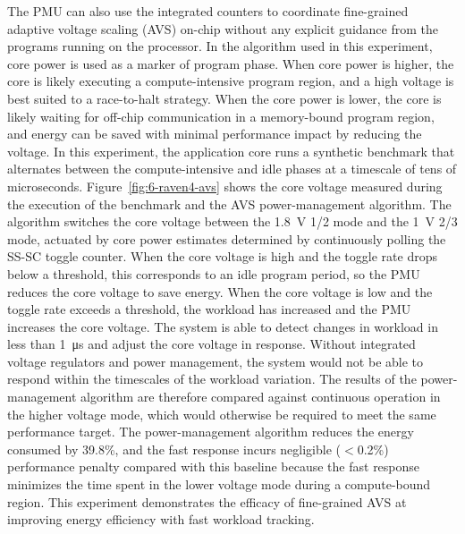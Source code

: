 \documentclass[graybox]{svmult}
\begin{document}
The PMU can also use the integrated counters to coordinate fine-grained adaptive voltage scaling (AVS) on-chip without any explicit guidance from the programs running on the processor.
In the algorithm used in this experiment, core power is used as a marker of program phase.
When core power is higher, the core is likely executing a compute-intensive program region, and a high voltage is best suited to a race-to-halt strategy. 
When the core power is lower, the core is likely waiting for off-chip communication in a memory-bound program region, and energy can be saved with minimal performance impact by reducing the voltage.
In this experiment, the application core runs a synthetic benchmark that alternates between the compute-intensive and idle phases at a timescale of tens of microseconds.
Figure~\ref{fig:6-raven4-avs} shows the core voltage measured during the execution of the benchmark and the AVS power-management algorithm.
The algorithm switches the core voltage between the \SI{1.8}{\volt} 1/2 mode and the \SI{1}{\volt} 2/3 mode, actuated by core power estimates determined by continuously polling the SS-SC toggle counter.
When the core voltage is high and the toggle rate drops below a threshold, this corresponds to an idle program period, so the PMU reduces the core voltage to save energy.
When the core voltage is low and the toggle rate exceeds a threshold, the workload has increased and the PMU increases the core voltage.
The system is able to detect changes in workload in less than \SI{1}{\micro\second} and adjust the core voltage in response.
Without integrated voltage regulators and power management, the system would not be able to respond within the timescales of the workload variation.
The results of the power-management algorithm are therefore compared against continuous operation in the higher voltage mode, which would otherwise be required to meet the same performance target.
The power-management algorithm reduces the energy consumed by 39.8\%, and the fast response incurs negligible ($<$0.2\%) performance penalty compared with this baseline because the fast response minimizes the time spent in the lower voltage mode during a compute-bound region.
This experiment demonstrates the efficacy of fine-grained AVS at improving energy efficiency with fast workload tracking.
\end{document}
